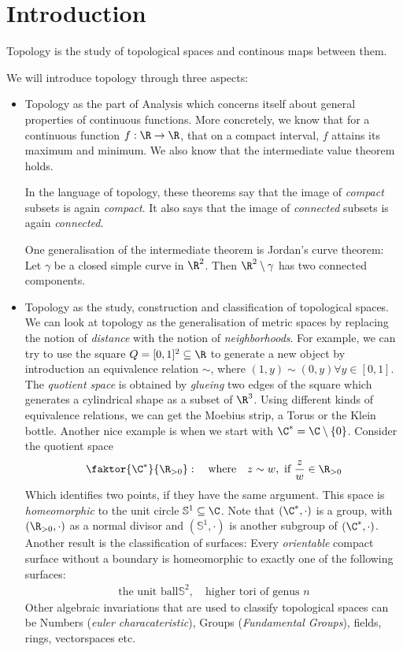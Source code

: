 \section{Introduction}
Topology is the study of topological spaces and continous maps between them.

We will introduce topology through three aspects:
\begin{itemize}
  \item Topology as the part of Analysis which concerns itself about general properties of continuous functions.
    More concretely, we know that for a continuous function $f: \R \to \R$, that on a compact interval, $f$ attains its maximum and minimum. 
    We also know that the intermediate value theorem holds.

    In the language of topology, these theorems say that the image of \emph{compact} subsets is again \emph{compact}.
    It also says that the image of \emph{connected} subsets is again \emph{connected}.

    One generalisation of the intermediate theorem is Jordan's curve theorem: Let $\gamma$ be a closed simple curve in $\R^2$. Then $\R^2 \setminus \gamma$ has two connected components.
  \item Topology as the study, construction and classification of topological spaces.
    We can look at topology as the generalisation of metric spaces by replacing the notion of \emph{distance} with the notion of \emph{neighborhoods}.
    For example, we can try to use the square $Q = [0,1]^2 \subseteq \R$ to generate a new object by introduction an equivalence relation $\sim$, where $(1,y) \sim (0,y) \forall y \in [0,1]$. The \emph{quotient space} is obtained by \emph{glueing} two edges of the square which generates a cylindrical shape as a subset of $\R^3$. Using different kinds of equivalence relations, we can get the Moebius strip, a Torus or the Klein bottle.
    Another nice example is when we start with $\C^\ast = \C \setminus \{0\}$. Consider the quotient space
    \begin{align*}
      \faktor{\C^\ast}{\R_{>0}}: \quad \text{where} \quad z \sim w, \text{ if } \frac{z}{w} \in \R_{> 0}
    \end{align*}
    Which identifies two points, if they have the same argument. This space is \emph{homeomorphic} to the unit circle $\mathbb{S}^1 \subseteq \C$.
    Note that $(\C^\ast, \cdot)$ is a group, with $(\R_{>0}, \cdot)$ as  a normal divisor and $(\mathbb{S}^1,\cdot)$ is another subgroup of $(\C^\ast,\cdot)$.
    Another result is the classification of surfaces: Every \emph{orientable} compact surface without a boundary is homeomorphic to exactly one of the following surfaces:
  \begin{align*}
    \text{the unit ball} \mathbb{S}^2, \quad \text{higher tori of genus } n
  \end{align*}
  Other algebraic invariations that are used to classify topological spaces can be Numbers (\emph{euler characateristic}), Groups (\emph{Fundamental Groups}), fields, rings, vectorspaces etc.
  

\end{itemize}
